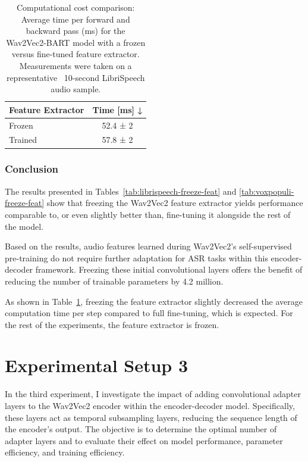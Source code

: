 \begin{table}[h]
    \centering
    \begin{tabular}{@{}lc@{}}
    \toprule
         Feature Extractor &  Time [ms] ↓   \\
         \midrule
         Frozen & 52.4 ± 2 \\
         Trained & 57.8 ± 2 \\
    \bottomrule
    \end{tabular}
    \caption{Computational cost comparison: Average time per forward and backward pass (ms) for the Wav2Vec2-BART model with a frozen versus fine-tuned feature extractor. Measurements were taken on a representative ~10-second LibriSpeech audio sample.}
    \label{tab:freeze_feat_time}
\end{table}

\subsubsection{Conclusion}
The results presented in Tables~\ref{tab:librispeech-freeze-feat} and \ref{tab:voxpopuli-freeze-feat} show that freezing the Wav2Vec2 feature extractor yields performance comparable to, or even slightly better than, fine-tuning it alongside the rest of the model.

Based on the results, audio features learned during Wav2Vec2's self-supervised pre-training do not require further adaptation for ASR tasks within this encoder-decoder framework. Freezing these initial convolutional layers offers the benefit of reducing the number of trainable parameters by 4.2 million.

As shown in Table~\ref{tab:freeze_feat_time}, freezing the feature extractor slightly decreased the average computation time per step compared to full fine-tuning, which is expected. For the rest of the experiments, the feature extractor is frozen.


\section{Experimental Setup 3}\label{exp2}

In the third experiment, I investigate the impact of adding convolutional adapter layers to the Wav2Vec2 encoder within the encoder-decoder model. Specifically, these layers act as temporal subsampling layers, reducing the sequence length of the encoder's output. The objective is to determine the optimal number of adapter layers and to evaluate their effect on model performance, parameter efficiency, and training efficiency. 

